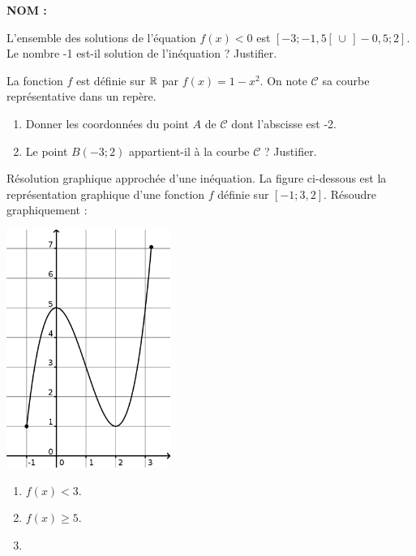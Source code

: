 \documentclass[a4paper,11pt,DIV15,BCOR0mm]{scrartcl}
\begin{document}
\noindent\textbf{NOM : }
\begin{exercice}
L'ensemble des solutions de l'équation $f(x)<0$ est
$[-3;-1,5[\,\cup\,]-0,5;2]$. Le nombre -1 est-il solution de l'inéquation ?
Justifier.
\end{exercice}
\vfill
\begin{exercice}
 La fonction $f$ est définie sur $\mathbb{R}$ par $f(x)=1-x^2$. On note $\mathcal{C}$ sa courbe représentative dans un repère.
\begin{enumerate}
 \item Donner les coordonnées du point $A$ de $\mathcal{C}$ dont l'abscisse est -2.
 \vfill
 \item Le point $B(-3;2)$ appartient-il à la courbe  $\mathcal{C}$ ? Justifier.
 \vfill
 \vfill
\end{enumerate}
\end{exercice}

\begin{exercice}Résolution graphique approchée d'une inéquation.
La figure ci-dessous est la représentation graphique d'une fonction $f$ définie sur $[-1;3,2]$. Résoudre graphiquement :
\begin{multicols}{2}
\includegraphics[width=0.4\textwidth]{fonction_inequation}
\vfill
 
\begin{enumerate}
  \item $f(x)<3$.
  \vfill
  \vfill
  \item $f(x)\geq 5$.
  \vfill
  \item[]
  \vfill
\end{enumerate}
\end{multicols}


\end{exercice}

 \vfill
\end{document}
